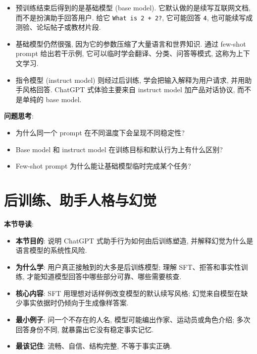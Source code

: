 \documentclass{../nndlcourse}
\begin{document}
\begin{enumerate}
\begin{itemize}
      \item 预训练结束后得到的是基础模型 (base model). 它默认做的是续写互联网文档, 而不是扮演助手回答用户. 给它 \texttt{What is 2 + 2?}, 它可能回答 \texttt{4}, 也可能续写成测验、论坛帖子或教材片段.
      \item 基础模型仍然很强, 因为它的参数压缩了大量语言和世界知识. 通过 few-shot prompt 给出若干示例, 它可以临时学会翻译、分类、问答等模式, 这称为上下文学习.
      \item 指令模型 (instruct model) 则经过后训练, 学会把输入解释为用户请求, 并用助手风格回答. ChatGPT 式体验主要来自 instruct model 加产品对话协议, 而不是单纯的 base model.
    \end{itemize}
\end{enumerate}

\textbf{问题思考}:
\begin{itemize}
  \item 为什么同一个 prompt 在不同温度下会呈现不同稳定性?
  \item Base model 和 instruct model 在训练目标和默认行为上有什么区别?
  \item Few-shot prompt 为什么能让基础模型临时完成某个任务?
\end{itemize}

\section{后训练、助手人格与幻觉}

\textbf{本节导读}:
\begin{itemize}
  \item \textbf{本节目的}: 说明 ChatGPT 式助手行为如何由后训练塑造, 并解释幻觉为什么是语言模型的系统性风险.
  \item \textbf{为什么学}: 用户真正接触到的大多是后训练模型; 理解 SFT、拒答和事实性训练, 才能知道模型回答中哪些部分可靠、哪些需要核查.
  \item \textbf{核心内容}: SFT 用理想对话样例改变模型的默认续写风格; 幻觉来自模型在缺少事实依据时仍倾向于生成像样答案.
  \item \textbf{最小例子}: 问一个不存在的人名, 模型可能编出作家、运动员或角色介绍; 多次回答身份不同, 就暴露出它没有稳定事实记忆.
  \item \textbf{最该记住}: 流畅、自信、结构完整, 不等于事实正确.
\end{itemize}
\end{document}
